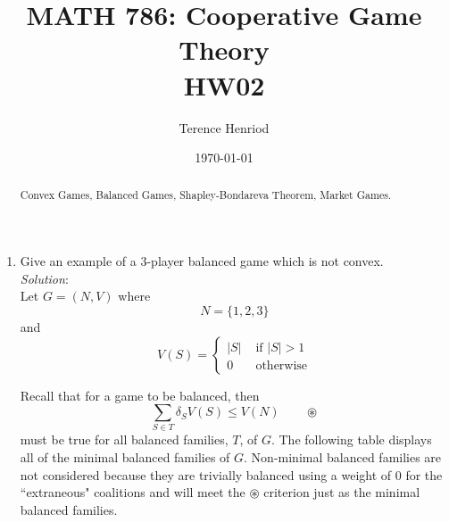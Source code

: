 \documentclass{article}
\title{MATH 786: Cooperative Game Theory \\ HW02}
\author{Terence Henriod}
\date{\today}
\begin{document}
\maketitle

\begin{abstract}
Convex Games, Balanced Games, Shapley-Bondareva Theorem, Market Games.
\end{abstract}


\newpage
\begin{enumerate}
\item Give an example of a 3-player balanced game which is not convex. \\

\textit{Solution}: \\
Let $G = (N, V)$ where 
\[
N = \{1, 2, 3\}
\]
and
\[
    V(S) = \begin{cases}
        |S|  & \text{ if } |S| > 1 \\
        0    & \text{ otherwise}
    \end{cases}
\]

Recall that for a game to be balanced, then
\[ \sum_{S \in T}{\delta_{S}V(S)} \le V(N) \qquad \circledast \]
must be true for all balanced families, $T$, of $G$.
The following table displays all of the minimal balanced families of $G$. Non-minimal balanced families are not considered because they are trivially balanced using a weight of 0 for the ``extraneous" coalitions and will meet the $\circledast$ criterion just as the minimal balanced families.


\end{enumerate}
\end{document}
